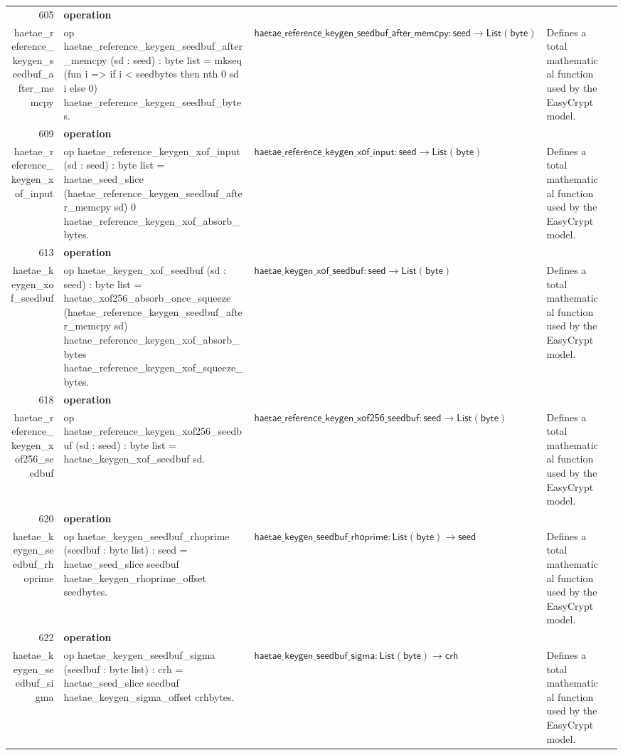 \documentclass[10pt]{article}
\newcommand{\ec}[1]{\begingroup\ttfamily\scriptsize #1\endgroup}
\begin{document}
\begin{longtable}{r L{0.17\textwidth} L{0.26\textwidth} L{0.27\textwidth} L{0.20\textwidth}}
605 & \textbf{operation}\\\ec{haetae\_reference\_keygen\_seedbuf\_after\_memcpy} & \ec{op haetae\_reference\_keygen\_seedbuf\_after\_memcpy (sd : seed) : byte list = mkseq (fun i => if i < seedbytes then nth 0 sd i else 0) haetae\_reference\_keygen\_seedbuf\_bytes.} & \(\mathsf{haetae\_reference\_keygen\_seedbuf\_after\_memcpy} : \mathsf{seed} \to \mathsf{List}(\mathsf{byte})\) & Defines a total mathematical function used by the EasyCrypt model. \\
609 & \textbf{operation}\\\ec{haetae\_reference\_keygen\_xof\_input} & \ec{op haetae\_reference\_keygen\_xof\_input (sd : seed) : byte list = haetae\_seed\_slice (haetae\_reference\_keygen\_seedbuf\_after\_memcpy sd) 0 haetae\_reference\_keygen\_xof\_absorb\_bytes.} & \(\mathsf{haetae\_reference\_keygen\_xof\_input} : \mathsf{seed} \to \mathsf{List}(\mathsf{byte})\) & Defines a total mathematical function used by the EasyCrypt model. \\
613 & \textbf{operation}\\\ec{haetae\_keygen\_xof\_seedbuf} & \ec{op haetae\_keygen\_xof\_seedbuf (sd : seed) : byte list = haetae\_xof256\_absorb\_once\_squeeze (haetae\_reference\_keygen\_seedbuf\_after\_memcpy sd) haetae\_reference\_keygen\_xof\_absorb\_bytes haetae\_reference\_keygen\_xof\_squeeze\_bytes.} & \(\mathsf{haetae\_keygen\_xof\_seedbuf} : \mathsf{seed} \to \mathsf{List}(\mathsf{byte})\) & Defines a total mathematical function used by the EasyCrypt model. \\
618 & \textbf{operation}\\\ec{haetae\_reference\_keygen\_xof256\_seedbuf} & \ec{op haetae\_reference\_keygen\_xof256\_seedbuf (sd : seed) : byte list = haetae\_keygen\_xof\_seedbuf sd.} & \(\mathsf{haetae\_reference\_keygen\_xof256\_seedbuf} : \mathsf{seed} \to \mathsf{List}(\mathsf{byte})\) & Defines a total mathematical function used by the EasyCrypt model. \\
620 & \textbf{operation}\\\ec{haetae\_keygen\_seedbuf\_rhoprime} & \ec{op haetae\_keygen\_seedbuf\_rhoprime (seedbuf : byte list) : seed = haetae\_seed\_slice seedbuf haetae\_keygen\_rhoprime\_offset seedbytes.} & \(\mathsf{haetae\_keygen\_seedbuf\_rhoprime} : \mathsf{List}(\mathsf{byte}) \to \mathsf{seed}\) & Defines a total mathematical function used by the EasyCrypt model. \\
622 & \textbf{operation}\\\ec{haetae\_keygen\_seedbuf\_sigma} & \ec{op haetae\_keygen\_seedbuf\_sigma (seedbuf : byte list) : crh = haetae\_seed\_slice seedbuf haetae\_keygen\_sigma\_offset crhbytes.} & \(\mathsf{haetae\_keygen\_seedbuf\_sigma} : \mathsf{List}(\mathsf{byte}) \to \mathsf{crh}\) & Defines a total mathematical function used by the EasyCrypt model. \\

\end{longtable}
\end{document}
